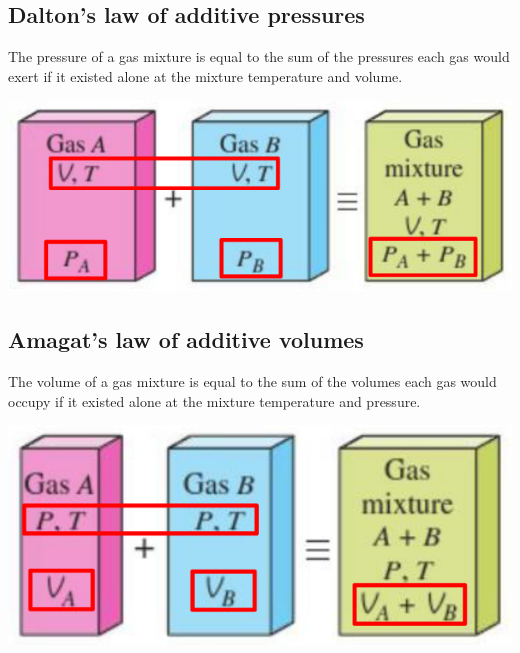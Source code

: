 \documentclass[11pt]{article}
\begin{document}
\subsection{Dalton's law of additive pressures}
\label{sec:org41cbfee}
The pressure of a gas mixture is equal to the sum of the pressures each gas would exert if it existed alone at the mixture temperature and volume.

\begin{center}
\includegraphics[width=.9\linewidth]{./images/daltons-law-of-additive-pressures.png}
\end{center}
\subsection{Amagat's law of additive volumes}
\label{sec:org3084d75}
The volume of a gas mixture is equal to the sum of the volumes each gas would occupy if it existed alone at the mixture temperature and pressure.

\begin{center}
\includegraphics[width=.9\linewidth]{./images/amagats-law-of-additive-volumes.png}
\end{center}

 \newpage
\end{document}
